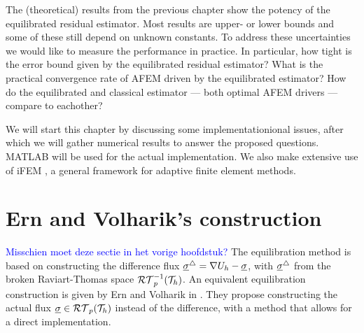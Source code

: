 \documentclass[thesis.tex]{subfiles}
\begin{document}
The (theoretical) results from the previous chapter show the potency of the equilibrated residual estimator.
Most results are upper- or lower bounds and some of these still depend on unknown constants.
To address these uncertainties we would like to measure the performance in practice.
In particular, how tight is the error bound given by the equilibrated residual estimator?
What is the practical convergence rate of AFEM driven by the equilibrated estimator?
How do the equilibrated and classical estimator --- both optimal AFEM drivers --- compare to eachother?

We will start this chapter by discussing some implementationional issues, after which we will gather numerical results to
answer the proposed questions. MATLAB \cite{MATLAB:2015} will be used for the actual implementation. We also
make extensive use of iFEM \cite{chenifem}, a general framework for adaptive finite element methods. 

\section{Ern and Volharik's construction}
\textcolor{blue}{Misschien moet deze sectie in het vorige hoofdstuk?}
The equilibration method is based on constructing the difference flux $\underline{\sigma}^\triangle 
= \nabla U_h - \underline{\sigma}$, 
with $\underline{\sigma}^\triangle$ from the broken Raviart-Thomas space $\mathcal{RT}_p^{-1}(\mathcal{T}_h)$. 
An equivalent equilibration construction is given by Ern and Volharik in \cite{ernequil}. They
propose constructing the actual flux $\underline{\sigma} \in \mathcal{RT}_p(\mathcal{T}_h)$ instead of the difference, with
a method that allows for a direct implementation.
\end{document}
